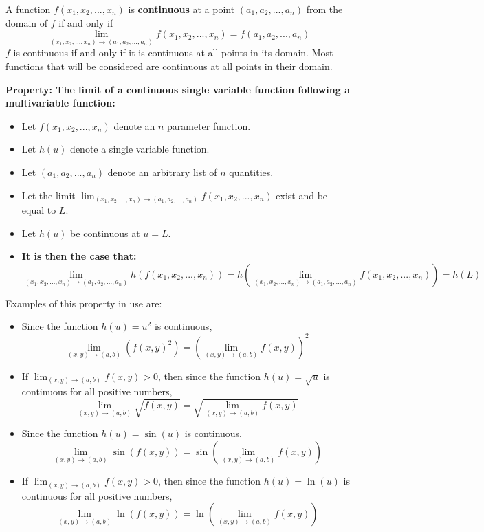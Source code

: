 \documentclass{article}
\begin{document}
\vspace{5mm}

A function \(f(x_1, x_2, ..., x_n)\) is {\bf continuous} at a point \((a_1, a_2, ..., a_n)\) from the domain of \(f\) if and only if  
\[\lim_{(x_1, x_2, ..., x_n) \rightarrow (a_1, a_2, ..., a_n)} f(x_1, x_2, ..., x_n) = f(a_1, a_2, ..., a_n)\]
\(f\) is continuous if and only if it is continuous at all points in its domain. Most functions that will be considered are continuous at all points in their domain. 

\vspace{5mm}

\textbf{Property: The limit of a continuous single variable function following a multivariable function:}
\begin{itemize}
\item Let \(f(x_1, x_2, ..., x_n)\) denote an \(n\) parameter function. 
\item Let \(h(u)\) denote a single variable function. 
\item Let \((a_1, a_2, ..., a_n)\) denote an arbitrary list of \(n\) quantities. 
\item Let the limit \(\lim_{(x_1, x_2, ..., x_n) \rightarrow (a_1, a_2, ..., a_n)} f(x_1, x_2, ..., x_n)\) exist and be equal to \(L\). 
\item Let \(h(u)\) be continuous at \(u = L\). 
\item {\bf It is then the case that:}
\[\lim_{(x_1, x_2, ..., x_n) \rightarrow (a_1, a_2, ..., a_n)} h(f(x_1, x_2, ..., x_n)) = h\left(\lim_{(x_1, x_2, ..., x_n) \rightarrow (a_1, a_2, ..., a_n)} f(x_1, x_2, ..., x_n)\right) = h(L)\]
\end{itemize}

Examples of this property in use are:
\begin{itemize}
\item Since the function \(h(u) = u^2\) is continuous, 
\[\lim_{(x, y) \rightarrow (a, b)} \left(f(x, y)^2\right) = \left(\lim_{(x, y) \rightarrow (a, b)} f(x, y)\right)^2\]
\item If \(\lim_{(x, y) \rightarrow (a, b)} f(x, y) > 0\), then since the function \(h(u) = \sqrt{u}\) is continuous for all positive numbers,  
\[\lim_{(x, y) \rightarrow (a, b)} \sqrt{f(x, y)} = \sqrt{\lim_{(x, y) \rightarrow (a, b)} f(x, y)}\]
\item Since the function \(h(u) = \sin(u)\) is continuous, 
\[\lim_{(x, y) \rightarrow (a, b)} \sin(f(x, y)) = \sin\left(\lim_{(x, y) \rightarrow (a, b)} f(x, y)\right)\] 
\item If \(\lim_{(x, y) \rightarrow (a, b)} f(x, y) > 0\), then since the function \(h(u) = \ln(u)\) is continuous for all positive numbers,  
\[\lim_{(x, y) \rightarrow (a, b)} \ln(f(x, y)) = \ln\left(\lim_{(x, y) \rightarrow (a, b)} f(x, y)\right)\]
\end{itemize}
\end{document}
